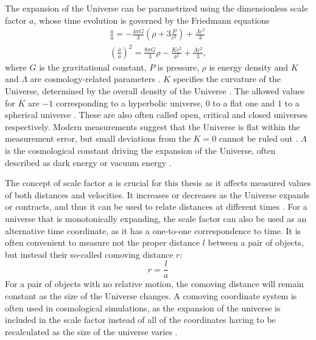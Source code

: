 \documentclass[english, oneside]{HYgradu}
\begin{document}
The expansion of the Universe can be parametrized using the dimensionless scale factor $a$, whose time evolution is governed by the Friedmann equations
\begin{align}\label{friedmann1}
\frac{\ddot{a}}{a} = -\frac{4\pi G}{3} \left( \rho + 3 \frac{P}{c^2} \right) + \frac{\Lambda c^2}{3} \\ \label{friedmann2}
{\left( \frac{\dot{a}}{a} \right)}^2 = \frac{8\pi G}{3}\rho - \frac{Kc^2}{a^2} + \frac{\Lambda c^2}{3},
\end{align}
where $G$ is the gravitational constant, $P$ is pressure, $\rho$ is energy density and $K$ and $\Lambda$ are cosmology-related parameters \citep{mo2010galaxy}. $K$ specifies the curvature of the Universe, determined by the overall density of the Universe \citep{mo2010galaxy}. The allowed values for $K$ are $-1$ corresponding to a hyperbolic universe, $0$ to a flat one and $1$ to a spherical universe \citep{mo2010galaxy}. These are also often called open, critical and closed universes respectively. Modern measurements suggest that the Universe is flat within the measurement error, but small deviations from the $K=0$ cannot be ruled out \citep{planck2016resultsI}. $\Lambda$ is the cosmological constant driving the expansion of the Universe, often described as dark energy or vacuum energy \citep{mo2010galaxy}.

The concept of scale factor $a$ is crucial for this thesis as it affects measured values of both distances and velocities. It increases or decreases as the Universe expands or contracts, and thus it can be used to relate distances at different times \citep{mo2010galaxy}. For a universe that is monotonically expanding, the scale factor can also be used as an alternative time coordinate, as it has a one-to-one correspondence to time. It is often convenient to measure not the proper distance $l$ between a pair of objects, but instead their so-called comoving distance $r$: \citep{mo2010galaxy}
\begin{equation} \label{comoving}
r = \frac{l}{a}
\end{equation}
For a pair of objects with no relative motion, the comoving distance will remain constant as the size of the Universe changes. A comoving coordinate system is often used in cosmological simulations, as the expansion of the universe is included in the scale factor instead of all of the coordinates having to be recalculated as the size of the universe varies \citep{griebel1002numerical}.
\end{document}
